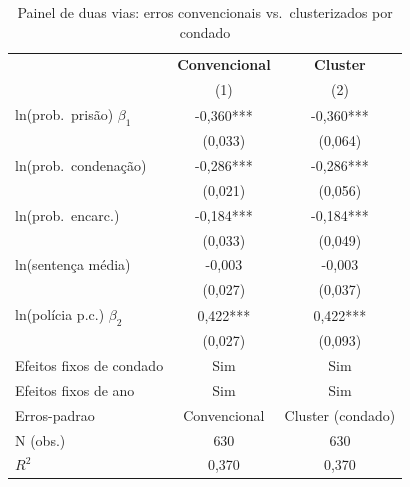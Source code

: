 \begin{table}[htbp]\centering
\caption{Painel de duas vias: erros convencionais vs.\ clusterizados por condado}\label{tab:q3_cluster}
\small
\begin{tabular}{lcc}
\toprule
 & \textbf{Convencional} & \textbf{Cluster} \\
 & (1) & (2) \\
\midrule
ln(prob.\ pris\~ao) $\beta_1$ & -0,360*** & -0,360*** \\
 & (0,033) & (0,064) \\
ln(prob.\ condena\c{c}\~ao) & -0,286*** & -0,286*** \\
 & (0,021) & (0,056) \\
ln(prob.\ encarc.) & -0,184*** & -0,184*** \\
 & (0,033) & (0,049) \\
ln(senten\c{c}a m\'edia) & -0,003 & -0,003 \\
 & (0,027) & (0,037) \\
ln(pol\'icia p.c.) $\beta_2$ & 0,422*** & 0,422*** \\
 & (0,027) & (0,093) \\
\midrule
Efeitos fixos de condado & Sim & Sim \\
Efeitos fixos de ano & Sim & Sim \\
Erros-padrao & Convencional & Cluster (condado) \\
N (obs.) & 630 & 630 \\
$R^2$ & 0,370 & 0,370 \\
\bottomrule
\end{tabular}
\par\vspace{2pt}{\footnotesize\itshape Coeficientes identicos (mesma estimacao); muda so o erro-padrao. *** p$<$0,01; ** p$<$0,05; * p$<$0,10. Dep.: ln(taxa de crime). O cluster por condado admite correlacao serial arbitraria dentro de cada condado.}
\end{table}
